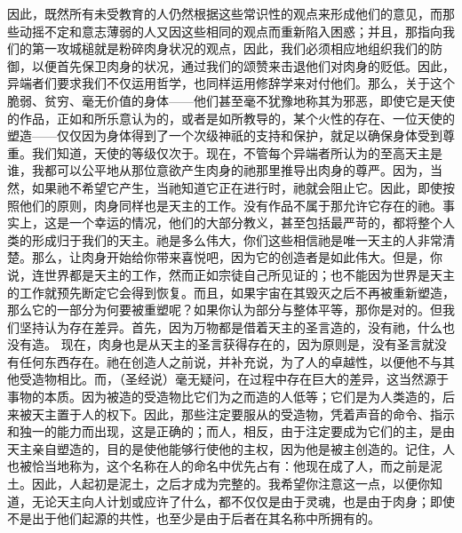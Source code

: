 因此，既然所有未受教育的人仍然根据这些常识性的观点来形成他们的意见，而那些动摇不定和意志薄弱的人又因这些相同的观点而重新陷入困惑；并且，那指向我们的第一攻城槌就是粉碎肉身状况的观点，因此，我们必须相应地组织我们的防御，以便首先保卫肉身的状况，通过我们的颂赞来击退他们对肉身的贬低。因此，异端者们要求我们不仅运用哲学，也同样运用修辞学来对付他们。那么，关于这个脆弱、贫穷、毫无价值的身体——他们甚至毫不犹豫地称其为邪恶，即使它是天使的作品，正如和所乐意认为的，或者是如所教导的，某个火性的存在、一位天使的塑造——仅仅因为身体得到了一个次级神祇的支持和保护，就足以确保身体受到尊重。我们知道，天使的等级仅次于。现在，不管每个异端者所认为的至高天主是谁，我都可以公平地从那位意欲产生肉身的祂那里推导出肉身的尊严。因为，当然，如果祂不希望它产生，当祂知道它正在进行时，祂就会阻止它。因此，即使按照他们的原则，肉身同样也是天主的工作。没有作品不属于那允许它存在的祂。事实上，这是一个幸运的情况，他们的大部分教义，甚至包括最严苛的，都将整个人类的形成归于我们的天主。祂是多么伟大，你们这些相信祂是唯一天主的人非常清楚。那么，让肉身开始给你带来喜悦吧，因为它的创造者是如此伟大。但是，你说，连世界都是天主的工作，然而正如宗徒自己所见证的；也不能因为世界是天主的工作就预先断定它会得到恢复。而且，如果宇宙在其毁灭之后不再被重新塑造，那么它的一部分为何要被重塑呢？如果你认为部分与整体平等，那你是对的。但我们坚持认为存在差异。首先，因为万物都是借着天主的圣言造的，没有祂，什么也没有造。 现在，肉身也是从天主的圣言获得存在的，因为原则是，没有圣言就没有任何东西存在。祂在创造人之前说，并补充说，为了人的卓越性，以便他不与其他受造物相比。而，（圣经说）毫无疑问，在过程中存在巨大的差异，这当然源于事物的本质。因为被造的受造物比它们为之而造的人低等；它们是为人类造的，后来被天主置于人的权下。因此，那些注定要服从的受造物，凭着声音的命令、指示和独一的能力而出现，这是正确的；而人，相反，由于注定要成为它们的主，是由天主亲自塑造的，目的是使他能够行使他的主权，因为他是被主创造的。记住，人也被恰当地称为，这个名称在人的命名中优先占有：他现在成了人，而之前是泥土。因此，人起初是泥土，之后才成为完整的。我希望你注意这一点，以便你知道，无论天主向人计划或应许了什么，都不仅仅是由于灵魂，也是由于肉身；即使不是出于他们起源的共性，也至少是由于后者在其名称中所拥有的。\par

